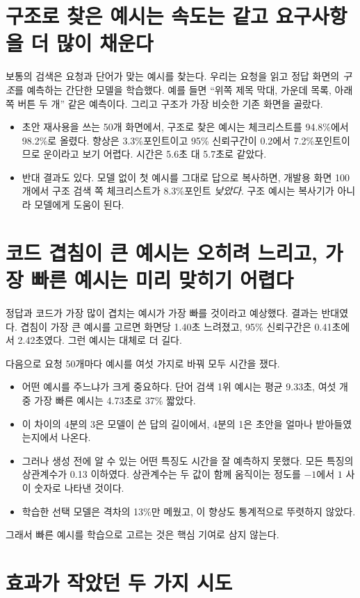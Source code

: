 \documentclass[10pt,a4paper]{article}
\begin{document}
\section{구조로 찾은 예시는 속도는 같고 요구사항을 더 많이 채운다}
보통의 검색은 요청과 단어가 맞는 예시를 찾는다. 우리는 요청을 읽고 정답 화면의 \emph{구조}를 예측하는 간단한 모델을 학습했다. 예를 들면 ``위쪽 제목 막대, 가운데 목록, 아래쪽 버튼 두 개'' 같은 예측이다. 그리고 구조가 가장 비슷한 기존 화면을 골랐다.
\begin{itemize}[itemsep=1pt]
\item 초안 재사용을 쓰는 50개 화면에서, 구조로 찾은 예시는 체크리스트를 94.8\%에서 98.2\%로 올렸다. 향상은 3.3\%포인트이고 95\% 신뢰구간이 0.2에서 7.2\%포인트이므로 운이라고 보기 어렵다. 시간은 5.6초 대 5.7초로 같았다.
\item 반대 결과도 있다. 모델 없이 첫 예시를 그대로 답으로 복사하면, 개발용 화면 100개에서 구조 검색 쪽 체크리스트가 8.3\%포인트 \emph{낮았다}. 구조 예시는 복사기가 아니라 모델에게 도움이 된다.
\end{itemize}

\section{코드 겹침이 큰 예시는 오히려 느리고, 가장 빠른 예시는 미리 맞히기 어렵다}
정답과 코드가 가장 많이 겹치는 예시가 가장 빠를 것이라고 예상했다. 결과는 반대였다. 겹침이 가장 큰 예시를 고르면 화면당 1.40초 느려졌고, 95\% 신뢰구간은 0.41초에서 2.42초였다. 그런 예시는 대체로 더 길다.

다음으로 요청 50개마다 예시를 여섯 가지로 바꿔 모두 시간을 쟀다.
\begin{itemize}[itemsep=1pt]
\item 어떤 예시를 주느냐가 크게 중요하다. 단어 검색 1위 예시는 평균 9.33초, 여섯 개 중 가장 빠른 예시는 4.73초로 37\% 짧았다.
\item 이 차이의 4분의 3은 모델이 쓴 답의 길이에서, 4분의 1은 초안을 얼마나 받아들였는지에서 나온다.
\item 그러나 생성 전에 알 수 있는 어떤 특징도 시간을 잘 예측하지 못했다. 모든 특징의 상관계수가 0.13 이하였다. 상관계수는 두 값이 함께 움직이는 정도를 $-1$에서 $1$ 사이 숫자로 나타낸 것이다.
\item 학습한 선택 모델은 격차의 13\%만 메웠고, 이 향상도 통계적으로 뚜렷하지 않았다.
\end{itemize}
그래서 빠른 예시를 학습으로 고르는 것은 핵심 기여로 삼지 않는다.

\section{효과가 작았던 두 가지 시도}
\end{document}
